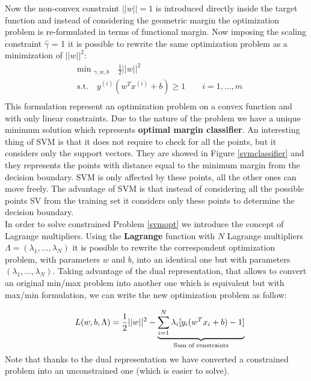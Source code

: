 Now the non-convex constraint $||w|| = 1$ is introduced directly inside the target function and instead of considering the geometric margin the optimization problem is re-formulated in terms of functional margin. Now imposing the scaling constraint $\hat{\gamma}$ = 1 it is possible to rewrite the same optimization problem as a minimization of $||w||^2$:
\begin{equation}\label{svmopt}
\begin{aligned}
&\text{min }_{\gamma,w,b} \quad \frac{1}{2}||w||^2\\
&\text{s.t.} \quad y^{(i)}(w^Tx^{(i)}+b) \geq 1 \qquad i = 1,\dots, m\\
\end{aligned}
\end{equation}
This formulation represent an optimization problem on a convex function and with only linear constraints. Due to the nature of the problem we have a unique minimum solution which represents \textbf{optimal margin classifier}. An interesting thing of SVM is that it does not require to check for all the points, but it considers  only the support vectors. They are showed in Figure \ref{svmclassifier} and they represents the points with distance equal to the minimum margin from the decision boundary. SVM is only affected by these points, all the other ones can move freely. The advantage of SVM is that instead of considering all the possible points SV from the training set it considers only these points to determine the decision boundary. \\

In order to solve constrained Problem \ref{svmopt} we introduce the concept of Lagrange multipliers. Using the \textbf{Lagrange} function with $N$ Lagrange multipliers $\Lambda = (\lambda_1,\dots,\lambda_N)$ it is possible to rewrite the correspondent optimization problem, with parameters $w$ and $b$, into an identical one but with parameters $(\lambda_1,\dots,\lambda_N)$. Taking advantage of the dual representation, that allows to convert an original min/max problem into another one which is equivalent but with max/min formulation, we can write the new optimization problem as follow:

\begin{equation}
\quad L(w,b,\Lambda) = \frac{1}{2}||w||^2 - \underbrace{\sum_{i = 1}^{N}\lambda_i[y_i(w^Tx_i+b)-1]}_{\text{Sum of constraints}}\\
\end{equation}
Note that thanks to the dual representation we have converted a constrained problem into an unconstrained one (which is easier to solve). \\


